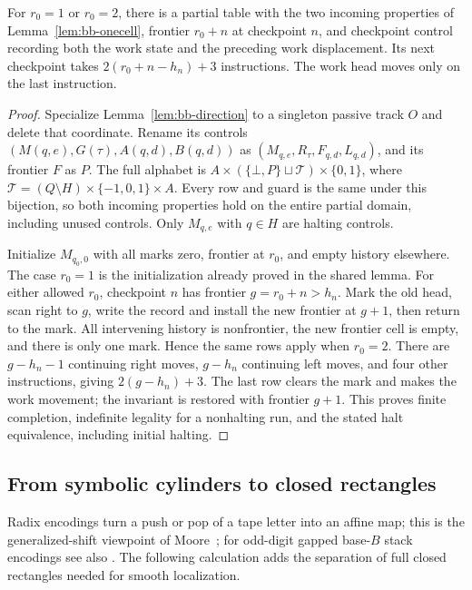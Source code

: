 \begin{lemma}\label{ba:six-compiler}
For $r_0=1$ or $r_0=2$, there is a partial table with the two incoming
properties of Lemma~\ref{lem:bb-onecell}, frontier $r_0+n$ at checkpoint
$n$, and checkpoint control recording both the work state and the
preceding work displacement.  Its next checkpoint takes
$2(r_0+n-h_n)+3$ instructions.  The work head moves only on the last
instruction.
\end{lemma}
\begin{proof}\label{ba:six-proof}
Specialize Lemma~\ref{lem:bb-direction} to a singleton passive track
$O$ and delete that coordinate.  Rename its controls
$(M(q,e),G(\tau),A(q,d),B(q,d))$ as
$(M_{q,e},R_\tau,F_{q,d},L_{q,d})$, and its frontier $F$ as $P$.
The full alphabet is
$A\times(\{\bot,P\}\sqcup\mathcal T)\times\{0,1\}$,
where $\mathcal T=(Q\setminus H)\times\{-1,0,1\}\times A$.
Every row and guard is the same under this bijection, so both incoming
properties hold on the entire partial domain, including unused controls.
Only $M_{q,e}$ with $q\in H$ are halting controls.

Initialize $M_{q_0,0}$ with all marks zero, frontier at $r_0$, and
empty history elsewhere.  The case $r_0=1$ is the initialization already
proved in the shared lemma.  For either allowed $r_0$, checkpoint $n$
has frontier $g=r_0+n>h_n$.  Mark the old head, scan right to $g$,
write the record and install the new frontier at $g+1$, then return to
the mark.  All intervening history is nonfrontier, the new frontier
cell is empty, and there is only one mark.  Hence the same rows apply
when $r_0=2$.  There are $g-h_n-1$ continuing right moves,
$g-h_n$ continuing left moves, and four other instructions, giving
$2(g-h_n)+3$.  The last row clears the mark and makes the work
movement; the invariant is restored with frontier $g+1$.  This proves
finite completion, indefinite legality for a nonhalting run, and the
stated halt equivalence, including initial halting.
\end{proof}

\subsection{From symbolic cylinders to closed rectangles}

Radix encodings turn a push or pop of a tape letter into an affine map;
this is the generalized-shift viewpoint of
Moore~\cite{Moore1990,Moore1991}; for odd-digit gapped base-$B$ stack encodings see also \cite{KoiranCosnardGarzon1994,SiegelmannSontag1995}.  The following calculation adds the
separation of full closed rectangles needed for smooth localization.

